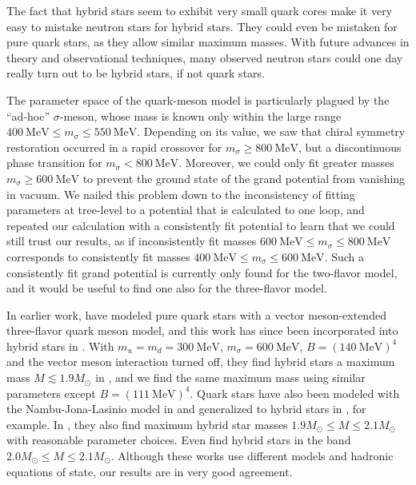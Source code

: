 The fact that hybrid stars seem to exhibit very small quark cores
make it very easy to mistake neutron stars for hybrid stars.
They could even be mistaken for pure quark stars, as they allow similar maximum masses.
With future advances in theory and observational techniques,
many observed neutron stars could one day really turn out to be hybrid stars, if not quark stars.

The parameter space of the quark-meson model is particularly plagued by the ``ad-hoc'' $\sigma$-meson,
whose mass is known only within the large range $\SI{400}{\mega\electronvolt} \leq m_\sigma \leq \SI{550}{\mega\electronvolt}$.
Depending on its value, we saw that chiral symmetry restoration occurred in a rapid crossover for $m_\sigma \geq \SI{800}{\mega\electronvolt}$,
but a discontinuous phase transition for $m_\sigma < \SI{800}{\mega\electronvolt}$.
Moreover, we could only fit greater masses $m_\sigma \geq \SI{600}{\mega\electronvolt}$ to prevent the ground state of the grand potential from vanishing in vacuum.
We nailed this problem down to the inconsistency of fitting parameters at tree-level to a potential that is calculated to one loop,
and repeated our calculation with a consistently fit potential to learn that we could still trust our results,
as if inconsistently fit masses $\SI{600}{\mega\electronvolt} \leq m_\sigma \leq \SI{800}{\mega\electronvolt}$
corresponds to consistently fit masses $\SI{400}{\mega\electronvolt} \leq m_\sigma \leq \SI{600}{\mega\electronvolt}$.
Such a consistently fit grand potential is currently only found for the two-flavor model,
and it would be useful to find one also for the three-flavor model.

In earlier work, \cite{ref:lsm3f_compact_stars} have modeled pure quark stars with a vector meson-extended three-flavor quark meson model,
and this work has since been incorporated into hybrid stars in \cite{ref:lsm3f_hybrid_stars}.
With $m_u = m_d = \SI{300}{\mega\electronvolt}$, $m_\sigma = \SI{600}{\mega\electronvolt}$, $B = (\SI{140}{\mega\electronvolt})^4$ and the vector meson interaction turned off,
they find hybrid stars a maximum mass $M \lesssim 1.9 M_\odot$ in \cite[figure 8]{ref:lsm3f_hybrid_stars}, %
and we find the same maximum mass using similar parameters except $B = (\SI{111}{\mega\electronvolt})^4$.
Quark stars have also been modeled with the Nambu-Jona-Lasinio model in \cite{ref:quark_star_njl} and generalized to hybrid stars in \cite{ref:hybrid_stars_njl}, for example.
In \cite[figure 3]{ref:hybrid_stars_njl}, they also find maximum hybrid star masses $1.9 M_\odot \leq M \leq 2.1 M_\odot$ with reasonable parameter choices.
Even \cite{ref:quark_hybrid_additional_ref} find hybrid stars in the band $2.0 M_\odot \leq M \leq 2.1 M_\odot$.
Although these works use different models and hadronic equations of state,
our results are in very good agreement.

